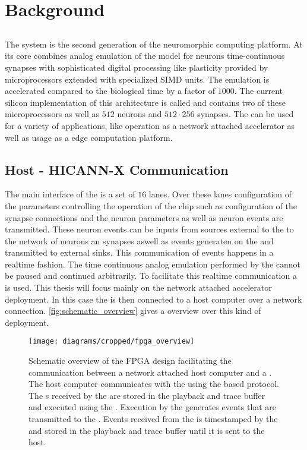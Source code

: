 \section{Background}
\subsection{\BSSTwo{}}
The \BSSTwo{} system is the second generation of the \BSS{} neuromorphic computing platform. At its core combines analog emulation of the \AdEx{}\autocite{ref:adex} model for neurons time-continuous synapses with sophisticated digital processing like plasticity provided by microprocessors extended with specialized SIMD units. The emulation is accelerated compared to the biological time by a factor of $\num{1000}$. The current silicon implementation of this architecture is called \HICANNX{} and contains two of these microprocessors as well as $\num{512}$ neurons and $\num{512} · \num{256}$ synapses. The \HICANNX{} \ASIC{} can be used for a variety of applications, like operation as a network attached accelerator\autocite{ref:network_accelerator} as well as usage as a edge computation platform\autocite{mobile_system}.

\subsection{Host - HICANN-X Communication}
The main interface of the \HICANNX{} \ASIC{} is a set of $\num{16}$ \LVDS{} lanes. Over these \LVDS{} lanes configuration of the parameters controlling the operation of the chip such as configuration of the synapse connections and the neuron parameters as well as neuron events are transmitted. These neuron events can be inputs from sources external to the \ASIC{} to the network of neurons an synapses aswell as events generaten on the \ASIC{} and transmitted to external sinks.
This communication of events happens in a realtime fashion. The time continuous analog emulation performed by the \ASIC{} cannot be paused and continued arbitrarily. To facilitate this realtime communication a \FPGA{} is used. This thesis will focus mainly on the network attached accelerator deployment. In this case the  \FPGA{} is then connected to a host computer over a network connection. \autoref{fig:schematic_overview} gives a overview over this kind of deployment.
\begin{figure}
\centerline{\texttt{[image: diagrams/cropped/fpga\_overview]}}
\caption{Schematic overview of the FPGA design facilitating the communication between a network attached host computer and a \HICANNX{} \ASIC{}. The host computer communicates with the \FPGA{} using the \UDP{} based \HostARQ{} protocol. The \PlaybackProgram{}s received by the \FPGA{} are stored in the playback and trace buffer and executed using the \pbexec{}. Execution by the \pbexec{} generates events that are transmitted to the \ASIC{}. Events received from the \ASIC{} is timestamped by the \pbexec{} and stored in the playback and trace buffer until it is sent to the host.}\label{fig:schematic_overview}
\end{figure}


